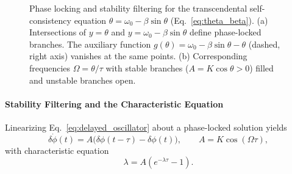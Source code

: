 \documentclass[pdflatex,sn-mathphys-num]{sn-jnl}
\begin{document}
\begin{figure}[h]

            \caption{\footnotesize
            Phase locking and stability filtering for the transcendental self-consistency equation
                $\theta=\omega_0-\beta\sin\theta$ (Eq.~\ref{eq:theta_beta}).
                (a) Intersections of $y=\theta$ and $y=\omega_0-\beta\sin\theta$ define phase-locked branches.
                The auxiliary function $g(\theta)=\omega_0-\beta\sin\theta-\theta$ (dashed, right axis) vanishes at the same points.
                (b) Corresponding frequencies $\Omega=\theta/\tau$ with stable branches ($A=K\cos\theta>0$) filled and unstable branches open.
            }
            \label{fig:phase_locking}
        \end{figure}

        \paragraph{Stability Filtering and the Characteristic Equation}

            Linearizing Eq.~\ref{eq:delayed_oscillator} about a phase-locked solution yields
            \begin{equation}
                \delta\dot{\phi}(t)
                =
                A\big(\delta\phi(t-\tau)-\delta\phi(t)\big),
                \qquad
                A=K\cos(\Omega\tau),
                \label{eq:linearized_phi}
            \end{equation}
            with characteristic equation
            \begin{equation}
                \lambda = A\left(e^{-\lambda\tau}-1\right).
                \label{eq:characteristic}
            \end{equation}
\end{document}
